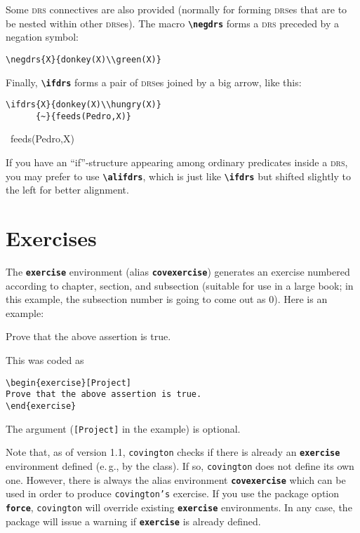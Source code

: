 \documentclass[english]{article}
\newcommand*\jmacro[1]{\textbf{\texttt{#1}}}
\newcommand*\jenv[1]{\textbf{\texttt{#1}}}
\newcommand*\jcsmacro[1]{\jmacro{\textbackslash{#1}}}
\newcommand*\joption[1]{\textbf{\texttt{#1}}}
\begin{document}
Some \textsc{drs} connectives are also provided (normally for forming
\textsc{drs}es that are to be nested within other \textsc{drs}es).
The macro \jcsmacro{negdrs} forms a \textsc{drs} preceded by a negation symbol:
\begin{lstlisting}[moretexcs={negdrs}]
\negdrs{X}{donkey(X)\\green(X)}
\end{lstlisting}
\begin{flushleft}
\end{flushleft}
Finally, \jcsmacro{ifdrs} forms a pair of \textsc{drs}es joined by a big arrow,
like this:
\begin{lstlisting}[moretexcs={ifdrs}]
\ifdrs{X}{donkey(X)\\hungry(X)}
      {~}{feeds(Pedro,X)}
\end{lstlisting}
\begin{flushleft}
      {~}{feeds(Pedro,X)}
\end{flushleft}
If you have an ``if''-structure appearing among ordinary predicates 
inside a \textsc{drs}, you may prefer to use \jcsmacro{alifdrs}, which is just like 
\jcsmacro{ifdrs} but shifted slightly to the left for better alignment.

\section{Exercises}\label{sec:exercises}

The \jenv{exercise} environment (alias \jenv{covexercise}) generates an exercise numbered according 
to chapter, section, and subsection (suitable for use in a large book; 
in this example, the subsection number is going to come out as 0). Here is an example:
\begin{exercise}[Project]
Prove that the above assertion is true.
\end{exercise}
This was coded as
\begin{lstlisting}
\begin{exercise}[Project]
Prove that the above assertion is true.
\end{exercise}
\end{lstlisting}
The argument (\verb"[Project]" in the example) is optional.

Note that, as of version 1.1, \texttt{covington} checks if there is already an \jenv{exercise} environment defined (e.\,g., by the class). If so, \texttt{covington} does not define its own one. However, there is always the alias environment \jenv{covexercise} which can be used in order to produce \texttt{covington's} exercise. If you use the package option \joption{force}, \texttt{covington} will override existing \jenv{exercise} environments. In any case, the package will issue a warning if \jenv{exercise} is already defined.
\end{document}
